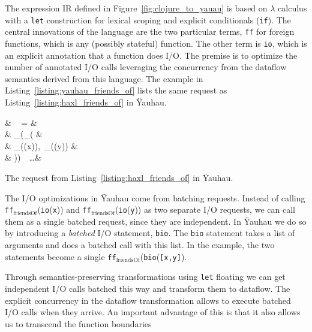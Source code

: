 The expression \ac{IR} defined in Figure~\ref{fig:clojure_to_yauau} is based on $\lambda$ calculus with a \texttt{let} construction for lexical scoping and explicit conditionals (\texttt{if}).
The central innovations of the language are the two particular terms, \texttt{ff} for foreign functions, which is any (possibly stateful) function.
The other term is \texttt{io}, which is an explicit annotation that a function does \ac{I/O}.
The premise is to optimize the number of annotated \ac{I/O} calls leveraging the concurrency from the dataflow semantics derived from this language.
The example in Listing~\ref{listing:yauhau_friends_of} lists the same request as Listing~\ref{listing:haxl_friends_of} in \"{Y}auhau.

\begin{listing}
\begin{flalign*}
& ~ = & \\ 
& \quad {}_(_( & \\ 
& \quad \quad {}_((x)),~_((y)) & \\
& \quad ))~~\ldots & 
\end{flalign*}
\caption{The request from Listing~\ref{listing:haxl_friends_of} in \"{Y}auhau.}
\label{listing:yauhau_friends_of}
\end{listing}

The \ac{I/O} optimizations in \"{Y}auhau come from batching requests.
Instead of calling \texttt{ff}$_\text{friendsOf}$(\texttt{io}(\texttt{x})) and \texttt{ff}$_\text{friendsOf}$(\texttt{io}(\texttt{y})) as two separate \ac{I/O} requests, we can call them as a single batched request, since they are independent.
In \"{Y}auhau we do so by introducing a \emph{batched} \ac{I/O} statement, \texttt{bio}.
The \texttt{bio} statement takes a list of arguments and does a batched call with this list.
In the example, the two statements become a single \texttt{ff}$_\text{friendsOf}$(\texttt{bio}(\texttt{[x,y]}).

Through semantics-preserving transformations using \texttt{let} floating we can get independent \ac{I/O} calls batched this way and transform them to dataflow.
The explicit concurrency in the dataflow transformation allows to execute batched \ac{I/O} calls when they arrive.
An important advantage of this is that it also allows us to transcend the function boundaries
